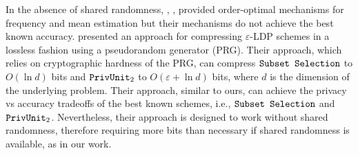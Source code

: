 In the absence of shared randomness, \cite{girgis2021a}, \cite{girgis2021b}, \cite{CKO20} provided order-optimal mechanisms for frequency and mean estimation but their mechanisms do not achieve the best known accuracy. \citet{FT21} presented an approach for compressing $\varepsilon$-LDP schemes in a lossless fashion using a pseudorandom generator (PRG). Their approach, which relies on cryptographic hardness of the PRG, can compress $\texttt{Subset Selection}$ to $O(\ln d)$ bits and $\texttt{PrivUnit}_2$ to $O(\varepsilon+\ln d)$ bits, where $d$ is the dimension of the underlying problem. 
Their approach, similar to ours, can achieve the privacy vs accuracy tradeoffs of the best known schemes, i.e., $\texttt{Subset Selection}$ and $\texttt{PrivUnit}_2$. Nevertheless, their approach is designed to work without shared randomness, therefore requiring more bits than necessary if shared randomness is available, as in our work. 


